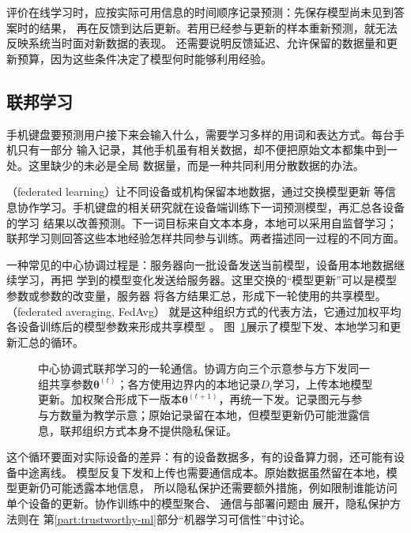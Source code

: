 评价在线学习时，应按实际可用信息的时间顺序记录预测：先保存模型尚未见到答案时的结果，
再在反馈到达后更新。若用已经参与更新的样本重新预测，就无法反映系统当时面对新数据的表现。
还需要说明反馈延迟、允许保留的数据量和更新预算，因为这些条件决定了模型何时能够利用经验。

\subsection{联邦学习}
\label{sec:federated-learning}

手机键盘要预测用户接下来会输入什么，需要学习多样的用词和表达方式。每台手机只有一部分
输入记录，其他手机虽有相关数据，却不便把原始文本都集中到一处。这里缺少的未必是全局
数据量，而是一种共同利用分散数据的办法。

（federated learning）让不同设备或机构保留本地数据，通过交换模型更新
等信息协作学习。手机键盘的相关研究就在设备端训练下一词预测模型，再汇总各设备的学习
结果以改善预测。下一词目标来自文本本身，本地可以采用自监督学习；
联邦学习则回答这些本地经验怎样共同参与训练。两者描述同一过程的不同方面。

一种常见的中心协调过程是：服务器向一批设备发送当前模型，设备用本地数据继续学习，再把
学到的模型变化发送给服务器。这里交换的“模型更新”可以是模型参数或参数的改变量，服务器
将各方结果汇总，形成下一轮使用的共享模型。（federated averaging, FedAvg）
就是这种组织方式的代表方法，它通过加权平均各设备训练后的模型参数来形成共享模型
。
图~\ref{fig:federated-learning-process}展示了模型下发、本地学习和更新汇总的循环。

\begin{figure}[t]
  \centering
  
  \caption{中心协调式联邦学习的一轮通信。协调方向三个示意参与方下发同一组共享参数$\bm\theta^{(t)}$；各方使用边界内的本地记录$D_i$学习，上传本地模型更新。加权聚合形成下一版本$\bm\theta^{(t+1)}$，再统一下发。记录图元与参与方数量为教学示意；原始记录留在本地，但模型更新仍可能泄露信息，联邦组织方式本身不提供隐私保证。}
  \label{fig:federated-learning-process}
\end{figure}
\FloatBarrier

这个循环要面对实际设备的差异：有的设备数据多，有的设备算力弱，还可能有设备中途离线。
模型反复下发和上传也需要通信成本。原始数据虽然留在本地，模型更新仍可能透露本地信息，
所以隐私保护还需要额外措施，例如限制谁能访问单个设备的更新。协作训练中的模型聚合、
通信与部署问题由
展开，隐私保护方法则在
第\ref{part:trustworthy-ml}部分“机器学习可信性”中讨论。

